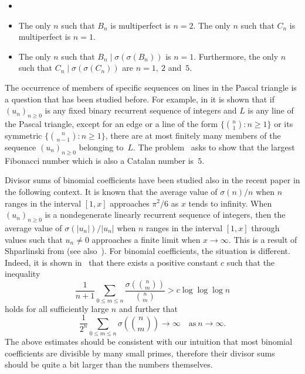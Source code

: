 \documentclass[twoside,amsthm]{elsart}
\begin{document}
\begin{thm}
\label{thm:2nn}
\begin{itemize}\item[]\end{itemize} %
\begin{itemize}\leftskip=10pt
\item[\normalfont (i)]
The only $n$ such that $B_n$ is multiperfect is $n=2$. The only $n$
such that $C_n$ is multiperfect is $n=1$.
\item[\normalfont (ii)] The only
$n$ such that $B_n\mid \sigma(\sigma(B_n))$ is $n=1$. Furthermore,
the only $n$ such that $C_n\mid\sigma(\sigma(C_n))$ are $n=1,~2$ 
and~$5$.
\end{itemize}
\end{thm}

The occurrence of members of specific sequences on lines in the
Pascal triangle is a question that has been studied before. For
example, in \cite{LuPa} it is shown that if $(u_n)_{n\ge 0}$ is any
fixed binary recurrent sequence of integers and $L$ is any line of
the Pascal triangle, except for an edge or a line of the form
$\{\binom{n}{1}:n\ge 1\}$ or its symmetric $\{\binom{n}{n-1}:n\ge
1\}$, there are at most finitely many members of the sequence
$(u_n)_{n\ge 0}$ belonging to~$L$. The problem~\cite{Lu4P} asks to
show that the largest Fibonacci number which is also a Catalan
number is~$5$.

Divisor sums of binomial coefficients have been studied also in the
recent paper \cite{Lu6} in the following context. It is known that
the average value of $\sigma(n)/n$ when $n$ ranges in the interval
$[1,x]$ approaches $\pi^2/6$ as $x$ tends to infinity. When
$(u_n)_{n\ge 0}$ is a nondegenerate linearly recurrent sequence of
integers, then the average value of $\sigma(|u_n|)/|u_n|$ when $n$
ranges in the interval $[1,x]$  through values such that $u_n\ne 0$
approaches a finite limit when $x\to\infty$. This is a result of
Shparlinski from \cite{Shp} (see also~\cite{LuSh}). For binomial
coefficients, the situation is different. Indeed, it is shown
in~\cite{Lu6} that there exists a positive constant $c$ such that the
inequality
$$
\frac{1}{n+1}\sum_{0\le m\le n}
\frac{\sigma\left(\binom{n}{m}\right)}{\binom{n}{m}}
> c\log\log\log n
$$
holds for all sufficiently large $n$ and further that
$$
\frac{1}{2^n} \sum_{0\le m\le n} \sigma\left(\binom{n}{m}\right)
\to \infty
\quad {\text{as}}~n\to\infty.
$$
The above estimates should be consistent with our intuition that
most binomial coefficients are divisible by many small primes,
therefore their divisor sums should be quite a bit larger than the
numbers themselves.
\end{document}
